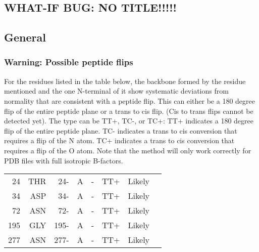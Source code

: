 \documentclass[a4paper]{article}
\def\showsect#1{
  \thesect\gdef\thesect{}
  \thessect\gdef\thessect{}
  \subsubsection{#1}
}
\gdef\thesect{\pagebreak[2]\section{WHAT-IF BUG: NO TITLE!!!!!}}
\gdef\thessect{\subsection{General}}
\begin{document}
\begin{warning}
\showsect{Warning: Possible peptide flips}
For the residues listed in the table below, the backbone formed by the
residue mentioned and the one N-terminal of it show systematic deviations
from normality that are consistent with a peptide flip. This can either
be a 180 degree flip of the entire peptide plane or a trans to cis flip.
(Cis to trans flips cannot be detected yet). The type can be TT+, TC-,
or TC+:
TT+ indicates a 180 degree flip of the entire peptide plane.
TC- indicates a trans to cis conversion that requires a flip of the N atom.
TC+ indicates a trans to cis conversion that requires a flip of the O atom.
Note that the method will only work correctly for PDB files with full
isotropic B-factors.
 
\begin{center}
 
\begin{supertabular}{rr@{ (}r@{) }rllll}
   24&THR &  24-&A &-&TT+ & Likely             &\\
   34&ASP &  34-&A &-&TT+ & Likely             &\\
   72&ASN &  72-&A &-&TT+ & Likely             &\\
  195&GLY & 195-&A &-&TT+ & Likely             &\\
  277&ASN & 277-&A &-&TT+ & Likely             &\\
\end{supertabular}\end{center}
\end{warning}
\end{document}
